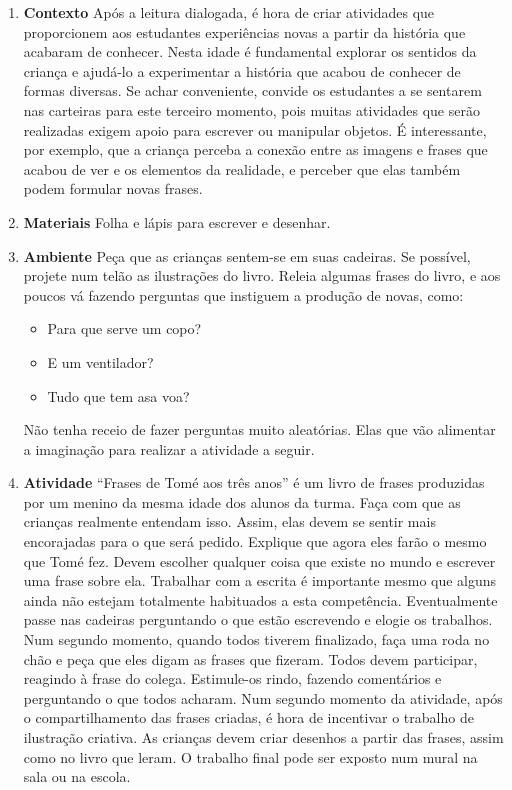 \documentclass[11pt]{extarticle}
\begin{document}
\begin{enumerate}
\item \textbf{Contexto}\quad 
Após a leitura dialogada, é hora de criar 
atividades que proporcionem aos estudantes experiências novas a partir da história 
que acabaram de conhecer. Nesta idade é fundamental explorar os sentidos da criança e 
ajudá-lo a experimentar a história que acabou de conhecer de formas diversas. Se achar 
conveniente, convide os estudantes a se sentarem nas carteiras para este terceiro 
momento, pois muitas atividades que serão realizadas exigem apoio para escrever 
ou manipular objetos. É interessante, por exemplo, que a criança perceba a conexão 
entre as imagens e frases que acabou de ver e os elementos da realidade, e perceber
que elas também podem formular novas frases.

\item \textbf{Materiais}\quad 
Folha e lápis para escrever e desenhar.

\item \textbf{Ambiente}\quad 
Peça que as crianças sentem-se em suas cadeiras.
Se possível, projete num telão as ilustrações do livro. 
Releia algumas frases do livro, e aos poucos vá 
fazendo perguntas que instiguem a produção de novas, como: 

\begin{itemize}
	\item Para que serve um copo? 
	\item E um ventilador? 
	\item Tudo que tem asa voa?
\end{itemize}

Não tenha receio de fazer perguntas muito aleatórias. 
Elas que vão alimentar a imaginação para realizar a atividade a seguir.

\item \textbf{Atividade}\quad 
``Frases de Tomé aos três anos'' é um livro de frases produzidas por
um menino da mesma idade dos alunos da turma. Faça com que as crianças
realmente entendam isso. Assim, elas devem se sentir mais encorajadas para
o que será pedido. 
Explique que agora eles farão o mesmo que Tomé fez.
Devem escolher qualquer coisa que existe no mundo e escrever uma frase
sobre ela. Trabalhar com a escrita é importante mesmo que alguns ainda
não estejam totalmente habituados a esta competência. 
Eventualmente passe nas cadeiras perguntando o que estão escrevendo 
e elogie os trabalhos.
Num segundo momento, quando todos tiverem finalizado, faça uma roda
no chão e peça que eles digam as frases que fizeram. Todos devem participar,
reagindo à frase do colega. Estimule-os rindo, fazendo comentários e perguntando
o que todos acharam. 
Num segundo momento da atividade, após o compartilhamento das frases criadas,
é hora de incentivar o trabalho de ilustração criativa. 
As crianças devem criar desenhos a partir das frases, assim como 
no livro que leram. 
O trabalho final pode ser exposto num mural na sala ou na escola. 


\end{enumerate}
\end{document}
